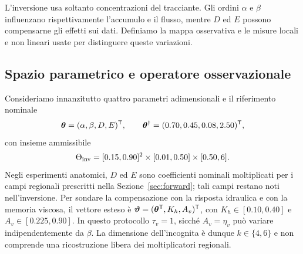 L'inversione usa soltanto concentrazioni del tracciante. Gli ordini $\alpha$ e $\beta$ influenzano rispettivamente l'accumulo e il flusso, mentre $D$ ed $E$ possono compensarne gli effetti sui dati. Definiamo la mappa osservativa e le misure locali e non lineari usate per distinguere queste variazioni.

\subsection{Spazio parametrico e operatore osservazionale}

Consideriamo innanzitutto quattro parametri adimensionali e il riferimento nominale
\begin{equation}
 \boldsymbol{\theta}=(\alpha,\beta,D,E)^{\mathsf T},\qquad
 \boldsymbol{\theta}^\dagger=(0.70,0.45,0.08,2.50)^{\mathsf T},
 \label{eq:theta-physical}
\end{equation}
con insieme ammissibile
\begin{equation}
 \Theta_{\rm inv}=[0.15,0.90]^2\times[0.01,0.50]\times[0.50,6].
 \label{eq:theta-inverse-box}
\end{equation}
Negli esperimenti anatomici, $D$ ed $E$ sono coefficienti nominali moltiplicati per i campi regionali prescritti nella Sezione~\ref{sec:forward}; tali campi restano noti nell'inversione. Per sondare la compensazione con la risposta idraulica e con la memoria viscosa, il vettore esteso è $\boldsymbol\vartheta=(\boldsymbol{\theta}^{\mathsf T},K_h,A_v)^{\mathsf T}$, con $K_h\in[0.10,0.40]$ e $A_v\in[0.225,0.90]$. In questo protocollo $\tau_v=1$, sicché $A_v=\eta_v$ può variare indipendentemente da $\beta$. La dimensione dell'incognita è dunque $k\in\{4,6\}$ e non comprende una ricostruzione libera dei moltiplicatori regionali.

